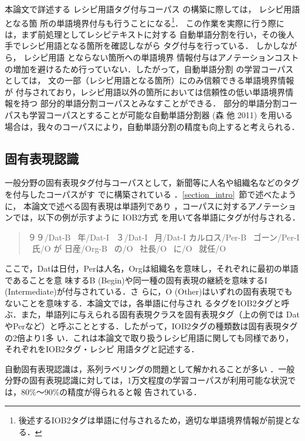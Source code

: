 \documentclass[japanese]{jnlp_1.4}
\begin{document}
本論文で詳述する
レシピ用語タグ付与コーパス
の構築に際しては，
レシピ用語
となる箇
所の単語境界付与も行うことになる\footnote{後述するIOB2タグは単語に付与されるため，適切な単語境界情報が前提となる．}．
この作業を実際に行う際には，まず前処理としてレシピテキストに対する
自動単語分割を行い，その後人手でレシピ用語となる箇所を確認しながら
タグ付与を行っている．
しかしながら，
レシピ用語
とならない箇所への単語境界
情報付与はアノテーションコストの増加を避けるため行っていない．したがって，自動単語分割
の学習コーパスとしては，
文の一部（レシピ用語となる箇所）にのみ信頼できる単語境界情報が
付与されており，レシピ用語以外の箇所においては信頼性の低い単語境界情報を持つ
部分的単語分割コーパスとみなすことができる．
部分的単語分割コーパスも学習コーパスとすることが可能な自動単語分割器
    (森 他 2011) を用いる場合は，我々のコーパスにより，自動単語分割の精度も向上すると考えられる．


\subsection{固有表現認識}
\label{rw_ner}

一般分野の固有表現タグ付与コーパスとして，新聞等に人名や組織名などのタグを付与したコーパスがす
でに構築されている
\cite{Message.Understanding.Conference.-.6:.A.Brief.History,IREX:.IR.and.IE.Evaluation.Project.in.Japanese}
．\ref{section_intro}~節で述べたように，
本論文で述べる固有表現は単語列であり
，コーパスに対するアノテーションでは，以下の例が示すように
IOB2方式
\cite{Representing.Text.Chunks}
を用いて各単語にタグが付与される．
\begin{quote}
  ９９/Dat-B \ 年/Dat-I \ ３/Dat-I \ 月/Dat-I カルロス/Per-B \ ゴーン/Per-I \ 氏/O が
  日産/Org-B \ の/O \ 社長/O \ に/O \ 就任/O
\end{quote}
ここで，Datは日付，Perは人名，Orgは組織名を意味し，それぞれに最初の単語であることを意
味するB (Begin)や同一種の固有表現の継続を意味するI (Intermediate)が付与されている．さ
らに，O (Other)はいずれの固有表現でもないことを意味する．本論文では，各単語に付与され
るタグをIOB2タグと呼ぶ．また，単語列に与えられる固有表現クラスを固有表現タグ（上の例では
Dat やPerなど）と呼ぶこととする．したがって，IOB2タグの種類数は固有表現タグの2倍より1多
い．これは本論文で取り扱うレシピ用語に関しても同様であり，それぞれをIOB2タグ・レシピ
用語タグと記述する．

自動固有表現認識は，系列ラベリングの問題として解かれることが多い
\cite{A.Maximum.Entropy.Approach.to.Named.Entity.Recognition,Conditional.Random.Fields:.Probabilistic.Models.for.Segmenting.and.Labeling.Sequence.Data,Introduction.to.the.CoNLL-2003.Shared.Task:.Language-Independent.Named.Entity.Recognition}
．一般分野の固有表現認識に対しては，1万文程度の学習コーパスが利用可能な状況では，80\%〜90\%の精度が得られると報
告されている．
\end{document}
